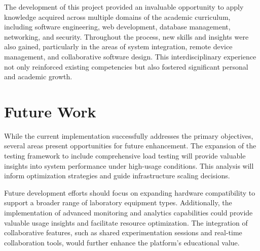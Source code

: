 The development of this project provided an invaluable opportunity to apply knowledge acquired across multiple domains of the academic curriculum, including software engineering, web development, database management, networking, and security. Throughout the process, new skills and insights were also gained, particularly in the areas of system integration, remote device management, and collaborative software design. This interdisciplinary experience not only reinforced existing competencies but also fostered significant personal and academic growth.

\section{Future Work}
\label{sec:future_work}

While the current implementation successfully addresses the primary objectives, several areas present opportunities for future enhancement. The expansion of the testing framework to include comprehensive load testing will provide valuable insights into system performance under high-usage conditions. This analysis will inform optimization strategies and guide infrastructure scaling decisions.

Future development efforts should focus on expanding hardware compatibility to support a broader range of laboratory equipment types. Additionally, the implementation of advanced monitoring and analytics capabilities could provide valuable usage insights and facilitate resource optimization. The integration of collaborative features, such as shared experimentation sessions and real-time collaboration tools, would further enhance the platform's educational value.